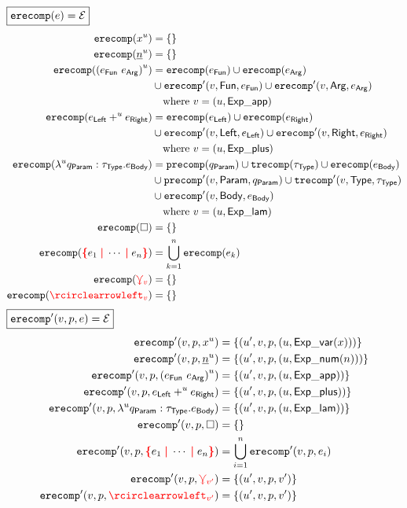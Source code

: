 \noindent $\boxed{\operatorname{\texttt{erecomp}}\mathopen{}\left(e\right)\mathclose{} = \mathcal{E}}$
%
\begin{align*}
  \erecomp{\varExp{x}{u}} &= \SetOf{}
  \\
  \erecomp{\numExp{n}{u}} &= \SetOf{}
  \\
  \erecomp{\appExp{e_\AppFun}{e_\AppArg}{u}}
  &= \erecomp{e_\AppFun}
  \cup \erecomp{e_\AppArg} \\
  &\cup \erecompPrime{v}{\AppFun}{e_\AppFun}
  \cup \erecompPrime{v}{\AppArg}{e_\AppArg} \\
  &\quad\text{where } v = (u, \ExpApp)
  \\
  \erecomp{\plusExp{e_\PlusLeft}{u}{e_\PlusRight}}
  &= \erecomp{e_\PlusLeft}
  \cup \erecomp{e_\PlusRight} \\
  &\cup \erecompPrime{v}{\PlusLeft}{e_\PlusLeft}
  \cup \erecompPrime{v}{\PlusRight}{e_\PlusRight} \\
  &\quad\text{where } v = (u, \ExpPlus)
  \\
  \erecomp{\lamExp{u}{q_\LamParam}{\tau_\LamType}{e_\LamBody}}
  &= \precomp{q_\LamParam}
  \cup \trecomp{\tau_\LamType}
  \cup \erecomp{e_\LamBody} \\
  &\cup \precompPrime{v}{\LamParam}{q_\LamParam}
  \cup \trecompPrime{v}{\LamType}{\tau_\LamType} \\
  &\cup \erecompPrime{v}{\LamBody}{e_\LamBody} \\
  &\quad\text{where } v = (u, \ExpLam)
  \\
  \erecomp{\hole} &= \SetOf{}
  \\
  \erecomp{\conflictHole{e_1, \cdots, e_n}}
  &= \bigcup_{k=1}^n \erecomp{e_k}
  \\
  \erecomp{\multiVertex{v}} &= \SetOf{}
  \\
  \erecomp{\cycleVertex{v}} &= \SetOf{}
\end{align*}
%
$\boxed{\operatorname{\operatorname{\texttt{erecomp}}^\prime}\mathopen{}\left(v, p, e\right)\mathclose{} = \mathcal{E}}$
%
\begin{align*}
  \erecompPrime{v}{p}{\varExp{x}{u}}
  &= \SetOf{(u', v, p, (u, \ExpVar(x)))}
  \\
  \erecompPrime{v}{p}{\numExp{n}{u}}
  &= \SetOf{(u', v, p, (u, \ExpNum(n)))}
  \\
  \erecompPrime{v}{p}{\appExp{e_\AppFun}{e_\AppArg}{u}}
  &= \SetOf{(u', v, p, (u, \ExpApp))}
  \\
  \erecompPrime{v}{p}{\plusExp{e_\PlusLeft}{u} {e_\PlusRight}}
  &= \SetOf{(u', v, p, (u, \ExpPlus))}
  \\
  \erecompPrime{v}{p}{\lamExp{u}{q_\LamParam}{\tau_\LamType}{e_\LamBody}}
  &= \SetOf{(u', v, p, (u, \ExpLam))}
  \\
  \erecompPrime{v}{p}{\hole} &= \SetOf{}
  \\
  \erecompPrime{v}{p}{\conflictHole{e_1, \cdots, e_n}}
  &= \bigcup_{i=1}^n \erecompPrime{v}{p}{e_i}
  \\
  \erecompPrime{v}{p}{\multiVertex{v'}}
  &= \SetOf{(u', v, p, v')}
  \\
  \erecompPrime{v}{p}{\cycleVertex{v'}}
  &= \SetOf{(u', v, p, v')}
\end{align*}
